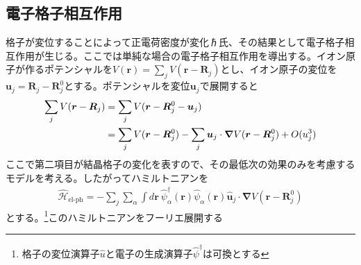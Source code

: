 \documentclass[dvipdfmx, 11pt, a4paper]{jsarticle}
\theoremstyle{definition}
\numberwithin{equation}{section}
\begin{document}
\subsection{電子格子相互作用}
    格子が変位することによって正電荷密度が変化ℏ氏、その結果として電子格子相互作用が生じる。ここでは単純な場合の電子格子相互作用を導出する。イオン原子が作るポテンシャルを$V(\bm{r}) = \sum_j V(\bm{r}-\bm{R}_j)$とし、イオン原子の変位を$\bm{u}_j=\bm{R}_j-\bm{R}_j^0$とする。ポテンシャルを変位$\bm{u}_j$で展開すると
    \begin{align}
        \sum_j V(\bm{r}-\bm{R}_j) &= \sum_jV(\bm{r}-\bm{R}_j^0 - \bm{u}_j) \notag \\
        &= \sum_j V(\bm{r}-\bm{R}_j^0) -\sum_j \bm{u}_j \cdot \bm{\nabla} V(\bm{r}-\bm{R}_j^0) + O(u_j^3)
    \end{align}
    ここで第二項目が結晶格子の変化を表すので、その最低次の効果のみを考慮するモデルを考える。したがってハミルトニアンを
    \begin{align}
        \hat{\mathscr{H}}_{\text{el-ph}} = -\sum_j\sum_\alpha \int d\bm{r}\ \hat{\psi}^\dagger_\alpha(\bm{r})  \hat{\psi}_\alpha(\bm{r}) \hat{\bm{u}}_j \cdot \bm{\nabla}V(\bm{r}-\bm{R}_j^0)
    \end{align}
    とする。\footnote{格子の変位演算子$\hat{u}$と電子の生成演算子$\hat{\psi}^\dagger$は可換とする}このハミルトニアンをフーリエ展開する
\end{document}

